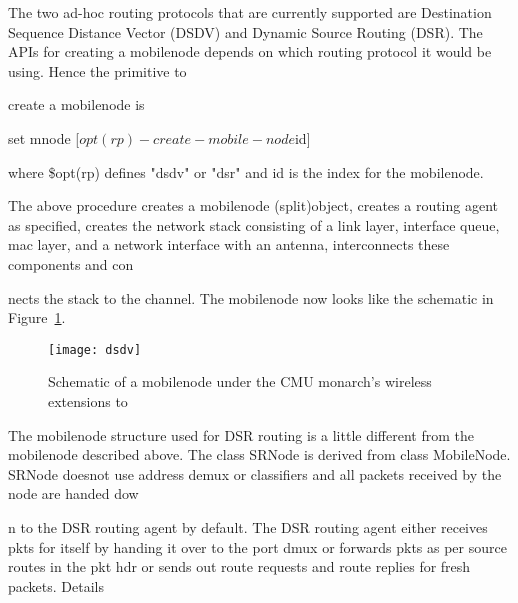 The two ad-hoc routing protocols that are currently supported are Destination Sequence Distance Vector (DSDV) and Dynamic Source Routing (DSR). The APIs for creating a mobilenode depends on which routing protocol it would be using. Hence the primitive to 











create a mobilenode is

\begin{program}
	set mnode [$opt(rp)-create-mobile-node $id] 
\end{program}
where \$opt(rp) defines "dsdv" or "dsr" and id is the index for the mobilenode.

The above procedure creates a mobilenode (split)object, creates a routing agent as specified, creates the network stack consisting of a link layer, interface queue, mac layer, and a network interface with an antenna, interconnects these components and con











nects the stack to the channel. The mobilenode now looks like the schematic in Figure~\ref{fig:mobilenode-dsdv}. 
\begin{figure}
    \centerline{\texttt{[image: dsdv]}}
    \caption{Schematic of a mobilenode under the CMU monarch's wireless extensions to \ns}
    \label{fig:mobilenode-dsdv}
\end{figure}

The mobilenode structure used for DSR routing is a little different from the mobilenode described above. The class SRNode is derived from class MobileNode. SRNode doesnot use address demux or classifiers and all packets received by the node are handed dow











n to the DSR routing agent by default. The DSR routing agent either receives pkts for itself by handing it over to the port dmux or forwards pkts as per source routes in the pkt hdr or sends out route requests and route replies for fresh packets. Details 











